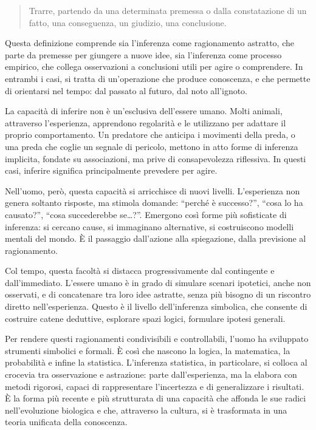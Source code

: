 \documentclass[
  11pt,
]{book}
\theoremstyle{mytheoremstyle}
\theoremstyle{mydefstyle}
\begin{document}
\begin{quote}
Trarre, partendo da una determinata premessa o dalla constatazione di un fatto, una conseguenza, un giudizio, una conclusione.
\end{quote}

Questa definizione comprende sia l'inferenza come ragionamento astratto, che parte da premesse per giungere a nuove idee, sia l'inferenza come processo empirico, che collega osservazioni a conclusioni utili per agire o comprendere. In entrambi i casi, si tratta di un'operazione che produce conoscenza, e che permette di orientarsi nel tempo: dal passato al futuro, dal noto all'ignoto.

La capacità di inferire non è un'esclusiva dell'essere umano. Molti animali, attraverso l'esperienza, apprendono regolarità e le utilizzano per adattare il proprio comportamento. Un predatore che anticipa i movimenti della preda, o una preda che coglie un segnale di pericolo, mettono in atto forme di inferenza implicita, fondate su associazioni, ma prive di consapevolezza riflessiva. In questi casi, inferire significa principalmente prevedere per agire.

Nell'uomo, però, questa capacità si arricchisce di nuovi livelli. L'esperienza non genera soltanto risposte, ma stimola domande: ``perché è successo?'', ``cosa lo ha causato?'', ``cosa succederebbe se\ldots?''. Emergono così forme più sofisticate di inferenza: si cercano cause, si immaginano alternative, si costruiscono modelli mentali del mondo. È il passaggio dall'azione alla spiegazione, dalla previsione al ragionamento.

Col tempo, questa facoltà si distacca progressivamente dal contingente e dall'immediato. L'essere umano è in grado di simulare scenari ipotetici, anche non osservati, e di concatenare tra loro idee astratte, senza più bisogno di un riscontro diretto nell'esperienza. Questo è il livello dell'inferenza simbolica, che consente di costruire catene deduttive, esplorare spazi logici, formulare ipotesi generali.

Per rendere questi ragionamenti condivisibili e controllabili, l'uomo ha sviluppato strumenti simbolici e formali. È così che nascono la logica, la matematica, la probabilità e infine la statistica. L'inferenza statistica, in particolare, si colloca al crocevia tra osservazione e astrazione: parte dall'esperienza, ma la elabora con metodi rigorosi, capaci di rappresentare l'incertezza e di generalizzare i risultati. È la forma più recente e più strutturata di una capacità che affonda le sue radici nell'evoluzione biologica e che, attraverso la cultura, si è trasformata in una teoria unificata della conoscenza.
\end{document}
